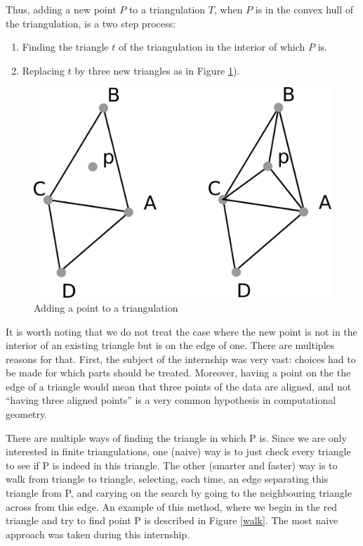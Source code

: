 \documentclass[a4paper,10pt]{article}
\begin{document}
Thus, adding a new point $P$ to a triangulation $T$, when $P$ is in the convex hull of the triangulation, is a two step process:
\begin{enumerate}
\item Finding the triangle $t$ of the triangulation in the interior of which $P$ is.
\item Replacing $t$ by three new triangles as in Figure \ref{adding}).
\end{enumerate}
\begin{figure}
\centering
\includegraphics[scale=2]{adding}
\caption{\label{adding} Adding a point to a triangulation}
\end{figure}

It is worth noting that we do not treat the case where the new point is not in the interior of an existing triangle but is on the edge of one. There are multiples reasons for that. First, the subject of the internship was very vast: choices had to be made for which parts should be treated. Moreover, having a point on the the edge of a triangle would mean that three points of the data are aligned, and not ``having three aligned points'' is a very common hypothesis in computational geometry. 

There are multiple ways of finding the triangle in which P is. Since we are only interested in finite triangulations, one (naive) way is to just check every triangle to see if P is indeed in this triangle. The other (smarter and faster) way is to walk from triangle to triangle, selecting, each time, an edge separating this triangle from P, and carying on the search by going to the neighbouring triangle across from this edge. An example of this method, where we begin in the red triangle and try to find point P is described in Figure \ref{walk}.
The most naive approach was taken during this internship.
\end{document}
